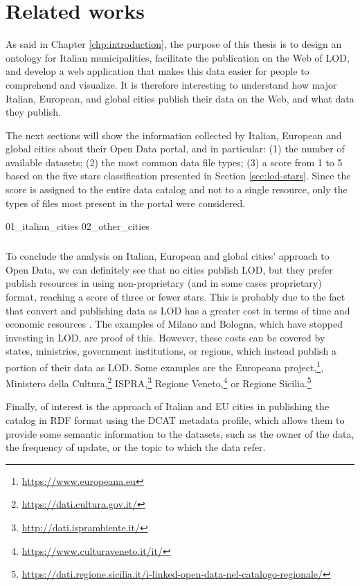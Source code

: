 \chapter{Related works}
\label{chp:related}

As said in Chapter \ref{chp:introduction}, the purpose of this thesis is to design an ontology for Italian municipalities, facilitate the publication on the Web of \acl{LOD}, and develop a web application that makes this data easier for people to comprehend and visualize. It is therefore interesting to understand how major Italian, European, and global cities publish their data on the Web, and what data they publish. 

The next sections will show the information collected by Italian, European and global cities about their Open Data portal, and in particular: (1) the number of available datasets; (2) the most common data file types; (3) a score from 1 to 5 based on the five stars classification presented in Section \ref{sec:lod-stars}. Since the score is assigned to the entire data catalog and not to a single resource, only the types of files most present in the portal were considered.

{01_italian_cities}%
{02_other_cities}%

\paragraph*{}
To conclude the analysis on Italian, European and global cities' approach to Open Data, we can definitely see that no cities publish \acl{LOD}, but they prefer publish resources in using non-proprietary (and in some cases proprietary) format, reaching a score of three or fewer stars. This is probably due to the fact that convert and publishing data as \acl{LOD} has a greater cost in terms of time and economic resources \cite{bauer2011linked}. The examples of Milano and Bologna, which have stopped investing in \acl{LOD}, are proof of this. However, these costs can be covered by states, ministries, government institutions, or regions, which instead publish a portion of their data as \acl{LOD}. Some examples are the Europeana project,\footnote{\url{https://www.europeana.eu}}, Ministero della Cultura,\footnote{\url{https://dati.cultura.gov.it/}} ISPRA,\footnote{\url{http://dati.isprambiente.it/}} Regione Veneto,\footnote{\url{https://www.culturaveneto.it/it/}} or Regione Sicilia.\footnote{\url{https://dati.regione.sicilia.it/i-linked-open-data-nel-catalogo-regionale/}}

Finally, of interest is the approach of Italian and EU cities in publishing the catalog in \ac{RDF} format using the DCAT metadata profile, which allows them to provide some semantic information to the datasets, such as the owner of the data, the frequency of update, or the topic to which the data refer.
